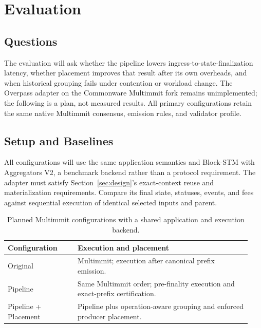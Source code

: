 \section{Evaluation}
\label{sec:evaluation}

\subsection{Questions}

The evaluation will ask whether the pipeline lowers ingress-to-state-finalization latency, whether placement improves that result after its own overheads, and when historical grouping fails under contention or workload change. The Overpass adapter on the Commonware Multimmit fork remains unimplemented; the following is a plan, not measured results. All primary configurations retain the same native Multimmit consensus, emission rules, and validator profile.

\subsection{Setup and Baselines}

All configurations will use the same application semantics and Block-STM with Aggregators V2, a benchmark backend rather than a protocol requirement. The adapter must satisfy Section~\ref{sec:design}'s exact-context reuse and materialization requirements. Compare its final state, statuses, events, and fees against sequential execution of identical selected inputs and parent. \citep{blockstm,aip47}

\begin{table}[t]
\centering\small
\setlength{\tabcolsep}{4pt}
\begin{tabular}{@{}>{\raggedright\arraybackslash}p{0.27\linewidth}>{\raggedright\arraybackslash}p{0.67\linewidth}@{}}
\toprule
Configuration & Execution and placement \\
\midrule
Original & Multimmit; execution after canonical prefix emission. \\
Pipeline & Same Multimmit order; pre-finality execution and exact-prefix certification. \\
Pipeline + Placement & Pipeline plus operation-aware grouping and enforced producer placement. \\
\bottomrule
\end{tabular}
\caption{Planned Multimmit configurations with a shared application and execution backend.}
\label{tab:baselines}
\end{table}

